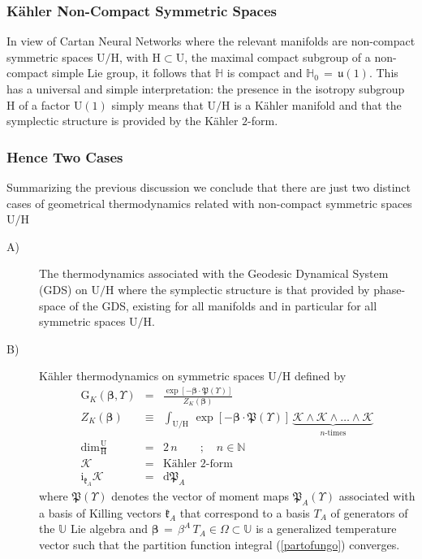 \documentclass[10pt,a4paper]{article}
\newcommand{\uu}{\mathfrak{u}}
\begin{document}
\subsubsection{K\"ahler Non-Compact Symmetric Spaces}
In view of Cartan Neural Networks where the relevant manifolds are non-compact symmetric spaces $\mathrm{U/H}$, with $\mathrm{H}\subset \mathrm{U}$, the maximal compact subgroup of a non-compact simple Lie group, it follows that $\mathbb{H}$ is compact and $\mathbb{H}_0 \, = \, \uu(1)$. This has a universal and simple interpretation: the presence in the isotropy subgroup $\mathrm{H}$ of a factor $\mathrm{U(1)}$ simply means that $\mathrm{U/H}$ is a K\"ahler manifold and that the symplectic structure is provided by the K\"ahler $2$-form.
\subsubsection{Hence Two Cases}
Summarizing the previous discussion we conclude that there are just two distinct cases of geometrical thermodynamics related with non-compact symmetric spaces $\mathrm{U/H}$
\begin{description}
  \item[A)] The thermodynamics associated with the Geodesic Dynamical System (GDS) on $\mathrm{U/H}$ where the symplectic structure is that provided by phase-space of the GDS, existing for all manifolds and in particular for all symmetric spaces  $\mathrm{U/H}$.
  \item[B)] K\"ahler  thermodynamics on symmetric spaces $\mathrm{U/H}$ defined by
  \begin{eqnarray}
  \mathrm{G}_{K}\left(\boldsymbol{\beta},\Upsilon\right)&=&
  \frac{\exp\left[-\boldsymbol{\beta}\cdot \boldsymbol{\mathfrak{P}}(\Upsilon )\right]}{Z_K(\boldsymbol{\beta})}\label{gibboneto}\\
  Z_K(\boldsymbol{\beta}) & \equiv & \int_{\mathrm{U/H}}\,  \exp\left[-\boldsymbol{\beta}\cdot \boldsymbol{\mathfrak{P}}(\Upsilon)\right]\,  \underbrace{\mathcal{K}\wedge\mathcal{K}\wedge\dots\wedge\mathcal{K}}_{\text{$n$-times}} \label{partofungo}\\
  \text{dim} \frac{\mathrm{U}}{\mathrm{H}} & = & 2 \, n \quad\quad ; \quad  n\in \mathbb{N}\label{parisono}\\
  \mathcal{K} & = & \text{K\"ahler $2$-form} \label{kallerone}\\
 \mathrm{ i}_{\boldsymbol{\mathfrak{k}}_A} \mathcal{K} &=& \mathrm{d}\mathfrak{P}_A \label{momentico}
\end{eqnarray}
where $\boldsymbol{\mathfrak{P}}(\Upsilon)$ denotes the vector of moment maps $\mathfrak{P}_A(\Upsilon)$ associated with
a basis of Killing vectors $\boldsymbol{\mathfrak{k}}_A$ that correspond to a basis $T_A$ of generators of the $\mathbb{U}$ Lie algebra and $\boldsymbol{\beta} \, = \, \beta^A \, T_A \in \Omega \subset \mathbb{U}$ is a generalized temperature vector such that the partition function integral (\ref{partofungo}) converges.
\end{description}
\end{document}
